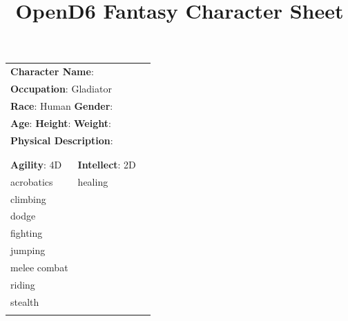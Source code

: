 \documentclass[10pt]{article}
\title{OpenD6 Fantasy Character Sheet}
\begin{document}
\pagestyle{fancy}
\fancyhf{}
\fancyfoot[R]{\thepage}
\renewcommand{\headrulewidth}{0pt}


\cleardoublepage
\begin{table}
\begin{tabular}{m{156pt} m{156pt} m{156pt}}
    \multicolumn{2}{l}{\textbf{Character Name}:  \hrulefill} \\
    \multicolumn{2}{l}{\textbf{Occupation}: Gladiator \hrulefill} \\
    \multicolumn{2}{l}{\textbf{Race}: Human \hrulefill \hspace{1em} \textbf{Gender}:  \hrulefill} \\
    \multicolumn{2}{l}{\textbf{Age}:  \hrulefill \hspace{1em} \textbf{Height}:  \hrulefill \hspace{1em}  \textbf{Weight}:  \hrulefill } \\
    \multicolumn{2}{l}{\textbf{Physical Description}:  \hrulefill } \\
    \multicolumn{2}{l}{ \hrulefill } \\
 & & \\
\textbf{Agility}: 4D \hrulefill      & \textbf{Intellect}: 2D \hrulefill  &                             \\

acrobatics           \hrulefill & healing              \hrulefill & \\

climbing             \hrulefill &  \hrulefill & \\

dodge                \hrulefill &  \hrulefill & \\

fighting             \hrulefill &  \hrulefill & \\

jumping              \hrulefill &  \hrulefill & \\

melee combat         \hrulefill &  \hrulefill & \\

riding               \hrulefill &  \hrulefill & \\

stealth              \hrulefill &  \hrulefill & \\

 \hrulefill &  \hrulefill & \\


\end{tabular}
\end{table}
\end{document}
